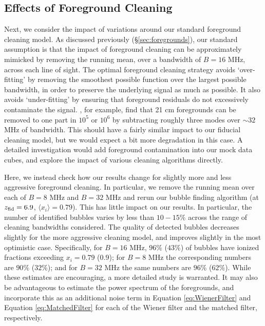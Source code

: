 \subsection{Effects of Foreground Cleaning} \label{sec:ForegroundCleaning}

Next, we consider the impact of variations around our standard foreground
cleaning model. As discussed previously (\S \ref{sec:foregrounds}), our
standard assumption is that the impact of foreground cleaning
can be approximately mimicked by removing the running mean, over a bandwidth
of $B=16$ MHz, across each line of sight. The optimal foreground cleaning
strategy avoids `over-fitting' by removing the smoothest possible function
over the largest possible bandwidth, in order to preserve the underlying signal
as much as possible. It also avoids `under-fitting' by ensuring that foreground
residuals do not excessively contaminate the signal. \cite{Liu:2011ih}, for
example, find that 21 cm foregrounds can be removed to one part in
$10^5$ or $10^6$ by subtracting roughly three modes over $\sim 32$ MHz of
bandwidth. This should have a fairly similar impact to our fiducial
cleaning model, but we would expect a bit more degradation in this case.
A detailed investigation would add foreground contamination into our
mock data cubes, and explore the impact of various cleaning algorithms directly.

Here, we instead check how our results change for slightly more
and less aggressive foreground cleaning. In particular, we remove
the running mean over each of $B=8$ MHz and $B=32$ MHz and rerun our
bubble finding algorithm (at $z_{\rm fid} = 6.9$, $\langle x_i \rangle = 0.79$). This has
little impact on our results. In particular, the number of identified
bubbles varies by less than $10-15\%$ across the range of cleaning
bandwidths considered. The quality of detected bubbles decreases slightly
for the more aggressive cleaning model, and improves slightly in the most optimistic
case. Specifically, for $B=16$ MHz, $96\%$ ($43\%$) of bubbles have
ionized fractions exceeding $x_i = 0.79$ ($0.9$); for $B=8$ MHz the
corresponding numbers are $90\%$ ($32\%$); and for $B=32$ MHz
the same numbers are $96\%$ ($62\%$). While these estimates are encouraging,
a more detailed study is warranted. It may also be advantageous to
estimate the power spectrum of the foregrounds, and incorporate this
as an additional noise term in Equation \ref{eq:WienerFilter} and Equation \ref{eq:MatchedFilter} for each of the Wiener filter and the matched filter, respectively.

